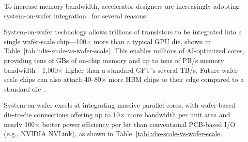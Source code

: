 \begin{table}[t]
    \vspace{-2mm}
\caption{System-on-Die vs. System-on-Wafer}
    \vspace{-3mm}
\label{tab1:die-scale-vs-wafer-scale}
\end{table}


To increase memory bandwidth, accelerator designers are increasingly adopting system-on-wafer integration~\cite{tsmc-advanced-packaging} for several reasons:

 System-on-wafer technology allows trillions of transistors to be integrated into a single wafer-scale chip—100$\times$ more than a typical GPU die, shown in Table~\ref{tab1:die-scale-vs-wafer-scale}. This enables millions of AI-optimized cores, providing tens of GBs of on-chip memory and up to tens of PB/s memory bandwidth—1,000$\times$ higher than a standard GPU’s several TB/s. Future wafer-scale chips can also attach 40–80$\times$ more HBM chips to their edge compared to a standard die~\cite{tsmc-advanced-packaging}.

 System-on-wafer excels at integrating massive parallel cores, with wafer-based die-to-die connections offering up to 10$\times$ more bandwidth per unit area and nearly 100$\times$ better power efficiency per bit than conventional PCB-based I/O (e.g., NVIDIA NVLink), as shown in Table~\ref{tab1:die-scale-vs-wafer-scale}.


